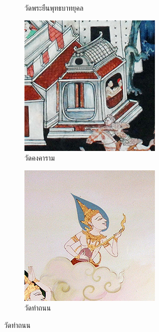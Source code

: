 \documentclass[hidelinks, a4paper,12pt]{article}
\numberwithin{equation}{section}							%
\numberwithin{equation}{section}
\begin{document}
{\begin{figure}[H]
\begin{subfigure}{0.25\linewidth}
			\caption{วัดพระยืนพุทธบาทยุคล}
		\end{subfigure}

		\bigskip
		
		\begin{subfigure}{0.2\linewidth}
			\centering
			\includegraphics[width=0.8\linewidth]{images/thaiart/case04-original.png}
			\caption{วัดคงคาราม}
		\end{subfigure}
		\begin{subfigure}{0.2\linewidth}
			\centering
			\includegraphics[width=0.8\linewidth]{images/thaiart/case05-original.png}
			\caption{วัดท่าถนน}

\end{subfigure}
\end{figure}}
\end{document}
